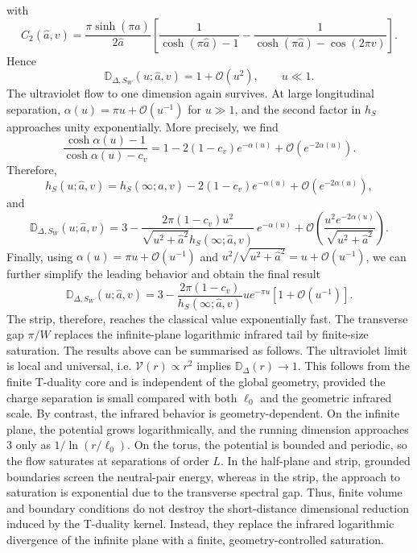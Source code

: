 \documentclass[nopacs,amsmath,amsfonts,amssymb,aps,superscriptaddress]{revtex4}
\begin{document}
with
\begin{equation}
C_2(\widehat{a},v)=\frac{\pi\sinh(\pi\widehat{a})}{2\widehat{a}}\left[
\frac{1}{\cosh(\pi \widehat{a})-1}-\frac{1}{\cosh(\pi\widehat{a})-\cos(2\pi v)}\right].
\end{equation}
Hence
\begin{equation}
\mathbb D_{\Delta,S_W}(u;\widehat{a},v)=1+\mathcal{O}(u^2),\qquad u\ll 1.
\end{equation}
The ultraviolet flow to one dimension again survives. At large longitudinal separation, $\alpha(u)=\pi u+\mathcal{O}(u^{-1})$ for $u\gg 1$, and the second factor in $h_S$ approaches unity exponentially. More precisely, we find
\begin{equation}
\frac{\cosh\alpha(u)-1}{\cosh\alpha(u)-c_v}=1-2(1-c_v)e^{-\alpha(u)}+\mathcal{O}(e^{-2\alpha(u)}).
\end{equation}
Therefore, 
\begin{equation}
h_S(u;\widehat{a},v)=h_S(\infty;\widehat{a},v)-2(1-c_v)e^{-\alpha(u)}+\mathcal{O}(e^{-2\alpha(u)}),
\end{equation}
and
\begin{equation}
\mathbb D_{\Delta,S_W}(u;\widehat{a},v)=3-\frac{2\pi(1-c_v)u^2}{\sqrt{u^2+\widehat{a}^2}h_S(\infty;\widehat{a},v)}~e^{-\alpha(u)}+\mathcal{O}\left(\frac{u^2 e^{-2\alpha(u)}}{\sqrt{u^2+\widehat{a}^2}}\right).
\end{equation}
Finally, using $\alpha(u)=\pi u+\mathcal{O}(u^{-1})$ and $u^2/\sqrt{u^2+\widehat{a}^2}=u+\mathcal{O}(u^{-1})$, we can further simplify the leading behavior and obtain the final result
\begin{equation}
\mathbb D_{\Delta,S_W}(u;\widehat{a},v)=3-\frac{2\pi(1-c_v)}{h_S(\infty;\widehat{a},v)}ue^{-\pi u}\left[1+\mathcal{O}(u^{-1})\right].
\end{equation}
The strip, therefore, reaches the classical value exponentially fast. The transverse gap $\pi/W$ replaces the infinite-plane logarithmic infrared tail by finite-size saturation. The results above can be summarised as follows. The ultraviolet limit is local and universal, i.e. $\mathcal V(r)\propto r^2$ implies $\mathbb D_\Delta(r)\to 1$. This follows from the finite T-duality core and is independent of the global geometry, provided the charge separation is small compared with both $\ell_0$ and the geometric infrared scale. By contrast, the infrared behavior is geometry-dependent. On the infinite plane, the potential grows logarithmically, and the running dimension approaches $3$ only as $1/\ln(r/\ell_0)$. On the torus, the potential is bounded and periodic, so the flow saturates at separations of order $L$. In the half-plane and strip, grounded boundaries screen the neutral-pair energy, whereas in the strip, the approach to saturation is exponential due to the transverse spectral gap. Thus, finite volume and boundary conditions do not destroy the short-distance dimensional reduction induced by the T-duality kernel. Instead, they replace the infrared logarithmic divergence of the infinite plane with a finite, geometry-controlled saturation.
\end{document}
